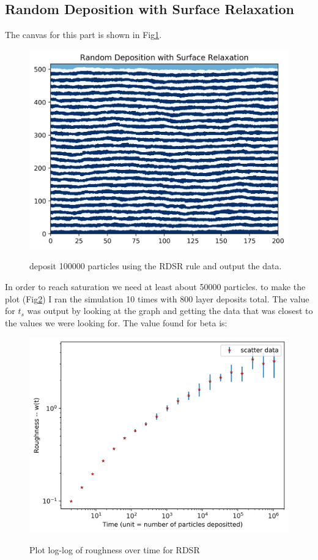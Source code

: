 \documentclass[12pt]{article}
\begin{document}
	\subsection{Random Deposition with Surface Relaxation}
	The canvas for this part is shown in Fig\ref{fig:RDSR}.
	\begin{figure}[h!]
		\centering
		\includegraphics[width=.9\linewidth]{../P5/canvas.jpg}
		\label{fig:RDSR}
		\caption{deposit 100000 particles using the RDSR rule and output the data.}
	\end{figure}
	In order to reach saturation we need
	at least about 50000 particles. to make the plot (Fig\ref{fig:RDSRplot}) I ran the simulation 10 times with 800
	layer deposits total. The value for $t_s$ was output by looking at the graph and getting
	the data that was closest to the values we were looking for.
	The value found for beta is:
	\begin{figure}[h!]
		\includegraphics[width=0.9\linewidth]{../P5/plot_for_beta.jpg}
		\label{fig:RDSRplot}
		\caption{Plot log-log of roughness over time for RDSR}
	\end{figure}
\end{document}
